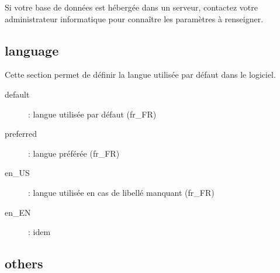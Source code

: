 Si votre base de données est hébergée dans un serveur, contactez votre administrateur informatique pour connaître les paramètres à renseigner.

\subsection{language}

Cette section permet de définir la langue utilisée par défaut dans le logiciel.

\begin{description}
\item [default] : langue utilisée par défaut (fr\_FR)
\item [preferred] : langue préférée (fr\_FR)
\item[en\_US]: langue utilisée en cas de libellé manquant (fr\_FR)
\item [en\_EN] : idem
\end{description}


\subsection{others}

